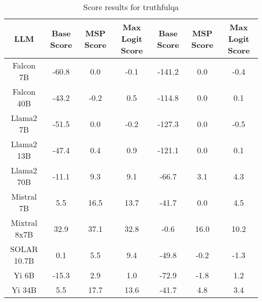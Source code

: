 \renewcommand\arraystretch{1.2}
\begin{table*}
\centering
\begin{tabular}{c|c|c|c|c|c|c}
LLM & Base Score & MSP Score & Max Logit Score & Base Score & MSP Score & Max Logit Score\\ \hline
Falcon 7B & -60.8 & 0.0 & -0.1 & -141.2 & 0.0 & -0.4\\
Falcon 40B & -43.2 & -0.2 & 0.5 & -114.8 & 0.0 & 0.1\\
Llama2 7B & -51.5 & 0.0 & -0.2 & -127.3 & 0.0 & -0.5\\
Llama2 13B & -47.4 & 0.4 & 0.9 & -121.1 & 0.0 & 0.1\\
Llama2 70B & -11.1 & 9.3 & 9.1 & -66.7 & 3.1 & 4.3\\
Mistral 7B & 5.5 & 16.5 & 13.7 & -41.7 & 0.0 & 4.5\\
Mixtral 8x7B & 32.9 & 37.1 & 32.8 & -0.6 & 16.0 & 10.2\\
SOLAR 10.7B & 0.1 & 5.5 & 9.4 & -49.8 & -0.2 & -1.3\\
Yi 6B & -15.3 & 2.9 & 1.0 & -72.9 & -1.8 & 1.2\\
Yi 34B & 5.5 & 17.7 & 13.6 & -41.7 & 4.8 & 3.4\\
\hline
\end{tabular}
\caption{Score results for truthfulqa}
\end{table*}
\label{tab:truthfulqa_score}
